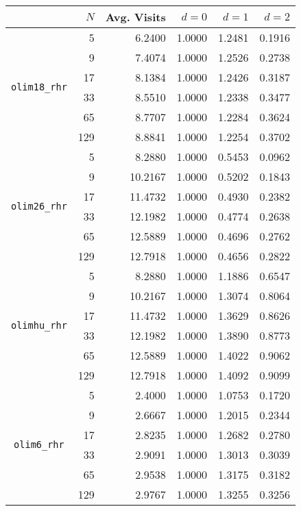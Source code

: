 \begin{tabular}{c|r|r|r|r|r}
& $N$ & Avg. Visits & $d = 0$ & $d = 1$ & $d = 2$ \\
\midrule
\multirow{6}{*}{\texttt{olim18\_rhr}} & 5 & 6.2400 & 1.0000 & 1.2481 & 0.1916 \\
& 9 & 7.4074 & 1.0000 & 1.2526 & 0.2738 \\
& 17 & 8.1384 & 1.0000 & 1.2426 & 0.3187 \\
& 33 & 8.5510 & 1.0000 & 1.2338 & 0.3477 \\
& 65 & 8.7707 & 1.0000 & 1.2284 & 0.3624 \\
& 129 & 8.8841 & 1.0000 & 1.2254 & 0.3702 \\
\midrule
\multirow{6}{*}{\texttt{olim26\_rhr}} & 5 & 8.2880 & 1.0000 & 0.5453 & 0.0962 \\
& 9 & 10.2167 & 1.0000 & 0.5202 & 0.1843 \\
& 17 & 11.4732 & 1.0000 & 0.4930 & 0.2382 \\
& 33 & 12.1982 & 1.0000 & 0.4774 & 0.2638 \\
& 65 & 12.5889 & 1.0000 & 0.4696 & 0.2762 \\
& 129 & 12.7918 & 1.0000 & 0.4656 & 0.2822 \\
\midrule
\multirow{6}{*}{\texttt{olimhu\_rhr}} & 5 & 8.2880 & 1.0000 & 1.1886 & 0.6547 \\
& 9 & 10.2167 & 1.0000 & 1.3074 & 0.8064 \\
& 17 & 11.4732 & 1.0000 & 1.3629 & 0.8626 \\
& 33 & 12.1982 & 1.0000 & 1.3890 & 0.8773 \\
& 65 & 12.5889 & 1.0000 & 1.4022 & 0.9062 \\
& 129 & 12.7918 & 1.0000 & 1.4092 & 0.9099 \\
\midrule
\multirow{6}{*}{\texttt{olim6\_rhr}} & 5 & 2.4000 & 1.0000 & 1.0753 & 0.1720 \\
& 9 & 2.6667 & 1.0000 & 1.2015 & 0.2344 \\
& 17 & 2.8235 & 1.0000 & 1.2682 & 0.2780 \\
& 33 & 2.9091 & 1.0000 & 1.3013 & 0.3039 \\
& 65 & 2.9538 & 1.0000 & 1.3175 & 0.3182 \\
& 129 & 2.9767 & 1.0000 & 1.3255 & 0.3256 \\
\midrule
\end{tabular}
